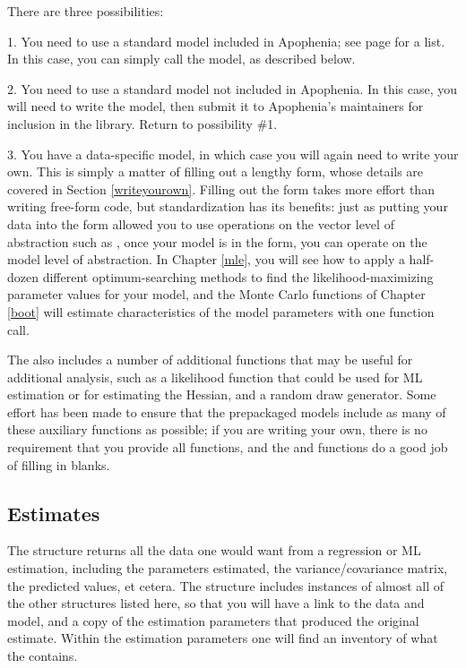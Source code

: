 There are three possibilities:

1. You need to use a standard model included in Apophenia; see page
\pageref{modellist} for a list. In this case, you can simply call the
model, as described below.

2. You need to use a standard model not included in Apophenia. In this
case, you will need to write the model, then submit it to Apophenia's
maintainers for inclusion in the library. Return to possibility \#1.

3. You have a data-specific model, in which case you will again need to
write your own. This is simply a matter of filling out a lengthy form,
whose details are covered in Section \ref{writeyourown}. Filling out the form takes more effort than writing free-form code, but standardization has its benefits: just as putting
your data into the  form allowed you to use operations
on the vector level of abstraction such as ,
once your model is in the  form, you can operate on
the model level of abstraction. In Chapter \ref{mle}, you will see how
to apply a half-dozen different optimum-searching methods to find the
likelihood-maximizing parameter values for your model, and the Monte
Carlo functions of Chapter \ref{boot} will estimate characteristics of
the model parameters with one function call.

The  also includes a
number of additional functions that may be useful for additional analysis,
such as a likelihood function that could be used for ML estimation or
for estimating the Hessian, and a random draw generator. Some effort
has been made to ensure that the prepackaged models include as many of
these auxiliary functions as possible; if you are writing your own,
there is no requirement that you provide all functions, and the  and 
functions do a good job of filling in blanks.

\subsection{Estimates} 
The  structure returns all the data one would want
from a regression or ML estimation, including the parameters estimated,
the variance/covariance matrix, the predicted values, et cetera. The structure
includes instances of almost all of the other structures listed here, so
that you will have a link to the data and model, and a copy of the
estimation parameters that produced the original estimate. Within the
estimation parameters one will find an inventory of
what the  contains.

